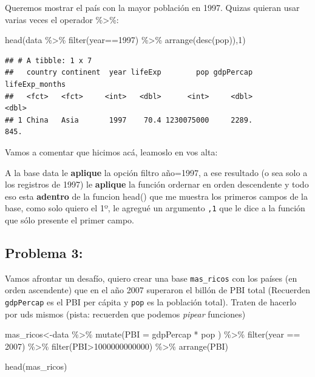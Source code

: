 \documentclass[
]{book}
\newenvironment{Shaded}{\begin{snugshade}}{\end{snugshade}}
\newcommand{\AttributeTok}[1]{\textcolor[rgb]{0.77,0.63,0.00}{#1}}
\newcommand{\DecValTok}[1]{\textcolor[rgb]{0.00,0.00,0.81}{#1}}
\newcommand{\FunctionTok}[1]{\textcolor[rgb]{0.00,0.00,0.00}{#1}}
\newcommand{\NormalTok}[1]{#1}
\newcommand{\OtherTok}[1]{\textcolor[rgb]{0.56,0.35,0.01}{#1}}
\newcommand{\SpecialCharTok}[1]{\textcolor[rgb]{0.00,0.00,0.00}{#1}}
\begin{document}
Queremos mostrar el país con la mayor población en 1997. Quizas quieran usar varias veces el operador \%\textgreater\%:

\begin{Shaded}
\begin{Highlighting}[]
\FunctionTok{head}\NormalTok{(data }\SpecialCharTok{\%\textgreater{}\%} \FunctionTok{filter}\NormalTok{(year}\SpecialCharTok{==}\DecValTok{1997}\NormalTok{) }\SpecialCharTok{\%\textgreater{}\%} \FunctionTok{arrange}\NormalTok{(}\FunctionTok{desc}\NormalTok{(pop)),}\DecValTok{1}\NormalTok{)}
\end{Highlighting}
\end{Shaded}

\begin{verbatim}
## # A tibble: 1 x 7
##   country continent  year lifeExp        pop gdpPercap lifeExp_months
##   <fct>   <fct>     <int>   <dbl>      <int>     <dbl>          <dbl>
## 1 China   Asia       1997    70.4 1230075000     2289.           845.
\end{verbatim}

Vamos a comentar que hicimos acá, leamoslo en vos alta:

A la base data le \textbf{aplique} la opción filtro año=1997, a ese resultado (o sea solo a los registros de 1997) le \textbf{aplique} la función ordernar en orden descendente y todo eso esta \textbf{adentro} de la funcion head() que me muestra los primeros campos de la base, como solo quiero el 1º, le agregué un argumento \texttt{,1} que le dice a la función que sólo presente el primer campo.

\hypertarget{problema-3-1}{%
\subsection{Problema 3:}\label{problema-3-1}}

Vamos afrontar un desafío, quiero crear una base \texttt{mas\_ricos} con los países (en orden ascendente) que en el año 2007 superaron el billón de PBI total (Recuerden \texttt{gdpPercap} es el PBI per cápita y \texttt{pop} es la población total). Traten de hacerlo por uds mismos (pista: recuerden que podemos \emph{pipear} funciones)

\begin{Shaded}
\begin{Highlighting}[]
\NormalTok{mas\_ricos}\OtherTok{\textless{}{-}}\NormalTok{data }\SpecialCharTok{\%\textgreater{}\%} \FunctionTok{mutate}\NormalTok{(}\AttributeTok{PBI =}\NormalTok{ gdpPercap }\SpecialCharTok{*}\NormalTok{ pop ) }\SpecialCharTok{\%\textgreater{}\%} \FunctionTok{filter}\NormalTok{(year }\SpecialCharTok{==} \DecValTok{2007}\NormalTok{) }\SpecialCharTok{\%\textgreater{}\%} \FunctionTok{filter}\NormalTok{(PBI}\SpecialCharTok{\textgreater{}}\DecValTok{1000000000000}\NormalTok{) }\SpecialCharTok{\%\textgreater{}\%} \FunctionTok{arrange}\NormalTok{(PBI)}

\FunctionTok{head}\NormalTok{(mas\_ricos)}
\end{Highlighting}
\end{Shaded}
\end{document}
